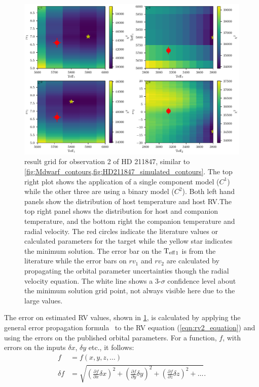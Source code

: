 \begin{figure}
    \centering
    \includegraphics[width=0.7\linewidth]{figures/companion_recovery/HD211847_result_pcolors}
    \caption[\textchisquared{} contour for  an observation {HD 211847}.]{\textchisquared{} result grid for observation 2 of {HD 211847}, similar to \cref{fig:Mdwarf_contours,fig:HD211847_simulated_contours}.
    The top right plot shows the application of a single component model (\(C^1\)) while the other three are using a binary model (\(C^2\)).
    Both left hand panels show the distribution of host temperature and host {RV}.\@ The top right panel shows the distribution for host and companion temperature, and the bottom right the companion temperature and radial velocity.
    The red circles indicate the literature values or calculated parameters for the target while the yellow star indicates the minimum \textchisquared{} solution.
    The error bar on the \({\textrm{T}_{\mathrm{eff}}}_{1}\) is from the literature while the error bars on \({rv}_1\) and \({rv}_2\) are calculated by propagating the orbital parameter uncertainties though the radial velocity equation.
    The white line shows a 3-\(\sigma\) confidence level about the minimum \textchisquared{} solution grid point, not always visible here due to the large \textchisquared{} values.}
    \label{fig:HD211847_result_contours}
\end{figure}

The error on estimated {RV} values, shown in \cref{fig:HD211847_result_contours}, is calculated by applying the general error propagation formula~\citep{ku_notes_1966} to the RV equation (\cref{eqn:rv2_equation}) and using the errors on the published orbital parameters.
For a function, \(f\), with errors on the inputs \(\delta x\), \(\delta y\) etc., it follows:
\begin{align}
f &= f(x, y, z, \ldots)\\
\delta f &= \sqrt{{\left( \frac{\partial f}{\partial x} \delta x\right)}^2 + {\left(\frac{\partial f}{\partial y} \delta y\right)}^2 + {\left(\frac{\partial f}{\partial z} \delta z\right)}^2 + \ldots}.
\end{align}


